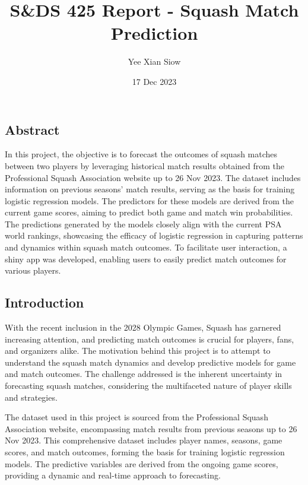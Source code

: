 \documentclass[
]{article}
\title{S\&DS 425 Report - Squash Match Prediction}
\author{Yee Xian Siow}
\date{17 Dec 2023}
\begin{document}
\maketitle

\hypertarget{abstract}{%
\subsection{Abstract}\label{abstract}}

In this project, the objective is to forecast the outcomes of squash
matches between two players by leveraging historical match results
obtained from the Professional Squash Association website up to 26 Nov
2023. The dataset includes information on previous seasons' match
results, serving as the basis for training logistic regression models.
The predictors for these models are derived from the current game
scores, aiming to predict both game and match win probabilities. The
predictions generated by the models closely align with the current PSA
world rankings, showcasing the efficacy of logistic regression in
capturing patterns and dynamics within squash match outcomes. To
facilitate user interaction, a shiny app was developed, enabling users
to easily predict match outcomes for various players.

\hypertarget{introduction}{%
\subsection{Introduction}\label{introduction}}

With the recent inclusion in the 2028 Olympic Games, Squash has garnered
increasing attention, and predicting match outcomes is crucial for
players, fans, and organizers alike. The motivation behind this project
is to attempt to understand the squash match dynamics and develop
predictive models for game and match outcomes. The challenge addressed
is the inherent uncertainty in forecasting squash matches, considering
the multifaceted nature of player skills and strategies.

The dataset used in this project is sourced from the Professional Squash
Association website, encompassing match results from previous seasons up
to 26 Nov 2023. This comprehensive dataset includes player names,
seasons, game scores, and match outcomes, forming the basis for training
logistic regression models. The predictive variables are derived from
the ongoing game scores, providing a dynamic and real-time approach to
forecasting.
\end{document}

